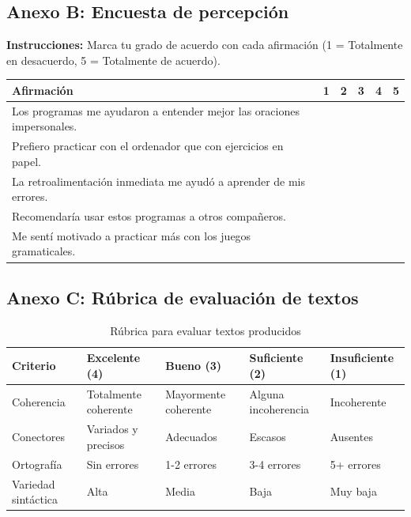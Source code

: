 \documentclass[12pt,spanish]{article}
\begin{document}
\subsection{Anexo B: Encuesta de percepción}

\textbf{Instrucciones:} Marca tu grado de acuerdo con cada afirmación (1 = Totalmente en desacuerdo, 5 = Totalmente de acuerdo).

\begin{center}
\begin{tabular}{|p{8cm}|c|c|c|c|c|}
\hline
\textbf{Afirmación} & \textbf{1} & \textbf{2} & \textbf{3} & \textbf{4} & \textbf{5} \\
\hline
Los programas me ayudaron a entender mejor las oraciones impersonales. & & & & & \\
\hline
Prefiero practicar con el ordenador que con ejercicios en papel. & & & & & \\
\hline
La retroalimentación inmediata me ayudó a aprender de mis errores. & & & & & \\
\hline
Recomendaría usar estos programas a otros compañeros. & & & & & \\
\hline
Me sentí motivado a practicar más con los juegos gramaticales. & & & & & \\
\hline
\end{tabular}
\end{center}

\subsection{Anexo C: Rúbrica de evaluación de textos}

\begin{table}[H]
\centering
\caption{Rúbrica para evaluar textos producidos}
\label{tab:rubrica}
\begin{tabular}{|p{3cm}|p{2.5cm}|p{2.5cm}|p{2.5cm}|p{2.5cm}|}
\hline
\textbf{Criterio} & \textbf{Excelente (4)} & \textbf{Bueno (3)} & \textbf{Suficiente (2)} & \textbf{Insuficiente (1)} \\
\hline
Coherencia & Totalmente coherente & Mayormente coherente & Alguna incoherencia & Incoherente \\
\hline
Conectores & Variados y precisos & Adecuados & Escasos & Ausentes \\
\hline
Ortografía & Sin errores & 1-2 errores & 3-4 errores & 5+ errores \\
\hline
Variedad sintáctica & Alta & Media & Baja & Muy baja \\
\hline
\end{tabular}
\end{table}
\end{document}
